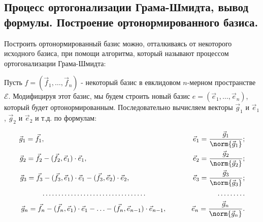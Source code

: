 \subsection{
    Процесс ортогонализации Грама-Шмидта, вывод формулы. Построение ортонормированного базиса.
}

Построить ортонормированный базис можно, отталкиваясь от некоторого исходного базиса, при помощи алгоритма, который называют процессом ортогонализации Грама-Шмидта:

\bigbreak

Пусть $f = (\vec{f}_1, \ldots, \vec{f}_n)$ - некоторый базис в евклидовом $n$-мерном пространстве $\mathcal{E}$. Модифицируя этот базис, мы будем строить новый базис $e = (\vec{e}_1, \ldots, \vec{e}_n)$, который будет ортонормированным. Последовательно вычисляем векторы $\vec{g}_1$ и $\vec{e}_1$, $\vec{g}_2$ и $\vec{e}_2$ и т.д. по формулам:

\begin{align*}
    \vec{g}_1 = \vec{f}_1, \quad \quad \quad \quad \quad \quad \quad \quad \quad \quad \quad \quad \quad \quad \quad
    \quad \quad \quad \quad \quad \thinspace \thinspace \thinspace \thinspace \thinspace \vec{e}_1 = \frac{\vec{g}_1}{\norm{\vec{g}_1}};\\
    \vec{g}_2 = \vec{f}_2 - (\vec{f}_2, \vec{e}_1) \cdot \vec{e}_1, \quad \quad \quad \quad \quad \quad \quad \quad \quad \quad
    \quad \quad \quad \quad \thinspace \thinspace \thinspace \thinspace \thinspace \vec{e}_2 = \frac{\vec{g}_2}{\norm{\vec{g}_2}};\\
    \vec{g}_3 = \vec{f}_3 - (\vec{f}_3, \vec{e}_1) \cdot \vec{e}_1 - (\vec{f}_3, \vec{e}_2) \cdot \vec{e}_2, \quad \quad \quad \quad \quad \quad \quad \quad \thinspace \thinspace \thinspace \thinspace \thinspace \vec{e}_3 = \frac{\vec{g}_3}{\norm{\vec{g}_3}};\\
    \ldots \ldots \ldots \ldots \ldots \ldots \ldots
    \ldots \ldots \ldots \ldots
    \quad \quad \quad \quad \quad \quad
    \quad \quad \quad \quad
    \ldots \ldots \ldots \\
    \vec{g}_n = \vec{f}_n - (\vec{f}_n, \vec{e}_1) \cdot \vec{e}_1 - \ldots - (\vec{f}_n, \vec{e}_{n - 1}) \cdot \vec{e}_{n - 1}, \quad \quad \quad \thinspace \thinspace \thinspace \vec{e}_n = \frac{\vec{g}_n}{\norm{\vec{g}_n}}.
\end{align*}

